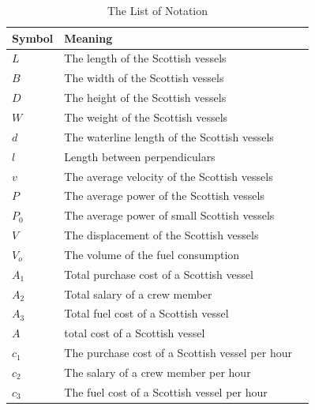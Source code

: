\documentclass{mcmthesis}
\begin{document}
\begin{center}
\begin{longtable}{p{}p{}m{}}
\caption{The List of Notation}\\
\hline
Symbol& Meaning \\
\hline

$L$      & The length of the Scottish vessels \\
$B$      & The width of the Scottish vessels 
                                                          \\
$D$     & The height of the Scottish vessels 
                                                        \\
$W$     & The weight of the Scottish vessels 
                                                        \\
$d$      & The   waterline length of the Scottish vessels \\
$l$       & Length between perpendiculars                                                           \\
$v$      & The average velocity  of the Scottish vessels                                            \\
$P$      & The average power of the Scottish vessels\\
$P_0$      & The average power of small Scottish vessels\\                                                      
$V$      & The displacement of the Scottish vessels 
                                                          \\
$V_o$      & The volume of the fuel consumption
                                                          \\
$A_1$     & Total purchase cost of a Scottish vessel
                                                        \\
$A_2$       & Total salary of a crew member                                                           \\
$A_3$      & Total fuel cost of a Scottish vessel                                        \\
$A$      & total cost of a Scottish vessel                                        \\
$c_1$     & The purchase cost of a Scottish vessel per hour
                                                        \\
$c_2$       & The salary of a crew member per hour                                                     \\
$c_3$      & The fuel cost of a Scottish vessel per hour                                       \\


\end{longtable}
\end{center}
\end{document}
